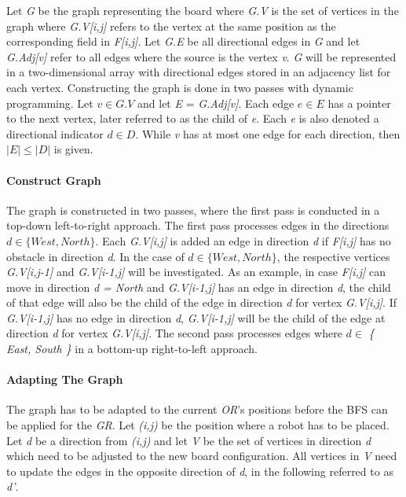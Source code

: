 \documentclass[]{article}
\let\oldparagraph\paragraph
\renewcommand{\paragraph}[1]{\oldparagraph{#1}\mbox{}}
\begin{document}
Let \emph{G} be the graph representing the board where \emph{G.V} is the
set of vertices in the graph where \emph{G.V{[}i,j{]}} refers to the
vertex at the same position as the corresponding field in
\emph{F{[}i,j{]}}. Let \emph{G.E} be all directional edges in \emph{G}
and let \emph{G.Adj{[}v{]}} refer to all edges where the source is the
vertex \emph{v}. \emph{G} will be represented in a two-dimensional array
with directional edges stored in an adjacency list for each vertex.
Constructing the graph is done in two passes with dynamic programming.
Let \(v \in G.V\) and let \emph{E} = \emph{G.Adj{[}v{]}}. Each edge
\(e \in E\) has a pointer to the next vertex, later referred to as the
child of \emph{e}. Each \emph{e} is also denoted a directional indicator
\(d \in D\). While \emph{v} has at most one edge for each direction,
then \(|E| \leq |D|\) is given.

\paragraph{Construct Graph}\label{construct-graph}

The graph is constructed in two passes, where the first pass is
conducted in a top-down left-to-right approach. The first pass processes
edges in the directions \(d \in \{West, North\}\). Each
\emph{G.V{[}i,j{]}} is added an edge in direction \emph{d} if
\emph{F{[}i,j{]}} has no obstacle in direction \emph{d}. In the case of
\(d \in \{West, North \}\), the respective vertices
\emph{G.V{[}i,j-1{]}} and \emph{G.V{[}i-1,j{]}} will be investigated. As
an example, in case \emph{F{[}i,j{]}} can move in direction \emph{d =
North} and \emph{G.V{[}i-1,j{]}} has an edge in direction \emph{d}, the
child of that edge will also be the child of the edge in direction
\emph{d} for vertex \emph{G.V{[}i,j{]}}. If \emph{G.V{[}i-1,j{]}} has no
edge in direction \emph{d}, \emph{G.V{[}i-1,j{]}} will be the child of
the edge at direction \emph{d} for vertex \emph{G.V{[}i,j{]}}. The
second pass processes edges where \(d \in\) \emph{\{ East, South \}} in
a bottom-up right-to-left approach.

\paragraph{Adapting The Graph}\label{adapting-the-graph}

The graph has to be adapted to the current \emph{OR}'s positions before
the BFS can be applied for the \emph{GR}. Let \emph{(i,j)} be the
position where a robot has to be placed. Let \emph{d} be a direction
from \emph{(i,j)} and let \emph{V} be the set of vertices in direction
\emph{d} which need to be adjusted to the new board configuration. All
vertices in \emph{V} need to update the edges in the opposite direction
of \emph{d}, in the following referred to as \emph{d'}.
\end{document}
